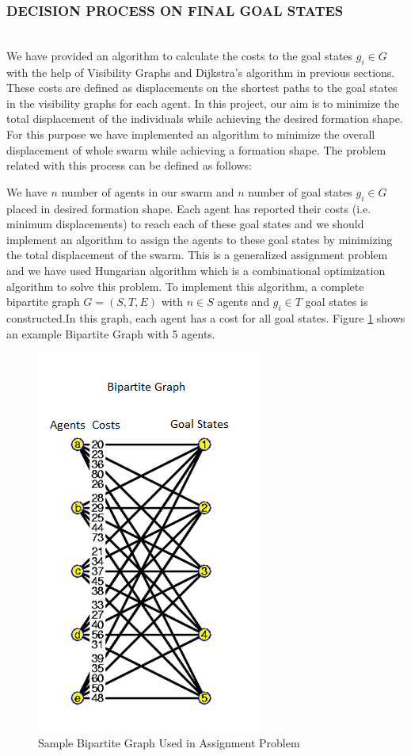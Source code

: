 \documentclass[letterpaper, 10 pt, conference]{ieeeconf}  %
\begin{document}
\subsubsection{DECISION PROCESS ON FINAL GOAL STATES}\hspace{0pt} \\
We have provided an algorithm to calculate the costs to the goal states $g_i \in G$ with the help of Visibility Graphs and Dijkstra's algorithm in previous sections. These costs are defined as displacements on the shortest paths to the goal states in the visibility graphs for each agent. In this project, our aim is to minimize the total displacement of the individuals while achieving the desired formation shape. For this purpose we have implemented an algorithm to minimize the overall displacement of whole swarm while achieving a formation shape. The problem related with this process can be defined as follows:

We have $n$ number of agents in our swarm and $n$ number of goal states $g_i \in G$ placed in desired formation shape. Each agent has reported their costs (i.e. minimum displacements) to reach each of these goal states and we should implement an algorithm to assign the agents to these goal states by minimizing the total displacement of the swarm. This is a generalized assignment problem and we have used Hungarian algorithm which is a combinational optimization algorithm to solve this problem. To implement this algorithm, a complete bipartite graph $G=(S,T,E)$ with $n \in S$ agents and $g_i \in T$ goal states is constructed.In this graph, each agent has a cost for all goal states. Figure \ref{biprrtti} shows an example Bipartite Graph with 5 agents.

\begin{figure}[thpb]
\centering
\includegraphics[width=.25\textwidth]{bipartite}
\caption{Sample Bipartite Graph Used in Assignment Problem \cite{102}} \label{biprrtti}
\end{figure}
\end{document}

